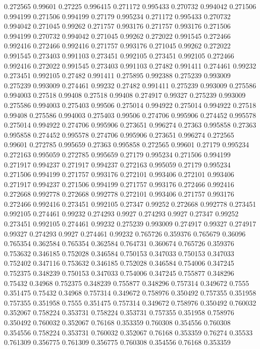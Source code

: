 0.272565 0.99601
0.27225 0.996415
0.271172 0.995433
0.270732 0.994042
0.271506 0.994199
0.271506 0.994199
0.27179 0.995234
0.271172 0.995433
0.270732 0.994042
0.271045 0.99262
0.271757 0.993176
0.271757 0.993176
0.271506 0.994199
0.270732 0.994042
0.271045 0.99262
0.272022 0.991545
0.272466 0.992416
0.272466 0.992416
0.271757 0.993176
0.271045 0.99262
0.272022 0.991545
0.273403 0.991103
0.273451 0.992105
0.273451 0.992105
0.272466 0.992416
0.272022 0.991545
0.273403 0.991103
0.27482 0.991411
0.274461 0.99232
0.273451 0.992105
0.27482 0.991411
0.275895 0.992388
0.275239 0.993009
0.275239 0.993009
0.274461 0.99232
0.27482 0.991411
0.275239 0.993009
0.275586 0.994003
0.27518 0.99408
0.27518 0.99408
0.274917 0.99327
0.275239 0.993009
0.275586 0.994003
0.275403 0.99506
0.275014 0.994922
0.275014 0.994922
0.27518 0.99408
0.275586 0.994003
0.275403 0.99506
0.274706 0.995906
0.274452 0.995578
0.275014 0.994922
0.274706 0.995906
0.273651 0.996274
0.27363 0.995858
0.27363 0.995858
0.274452 0.995578
0.274706 0.995906
0.273651 0.996274
0.272565 0.99601
0.272785 0.995659
0.27363 0.995858
0.272565 0.99601
0.27179 0.995234
0.272163 0.995059
0.272785 0.995659
0.27179 0.995234
0.271506 0.994199
0.271917 0.994237
0.271917 0.994237
0.272163 0.995059
0.27179 0.995234
0.271506 0.994199
0.271757 0.993176
0.272101 0.993406
0.272101 0.993406
0.271917 0.994237
0.271506 0.994199
0.271757 0.993176
0.272466 0.992416
0.272668 0.992778
0.272668 0.992778
0.272101 0.993406
0.271757 0.993176
0.272466 0.992416
0.273451 0.992105
0.27347 0.99252
0.272668 0.992778
0.273451 0.992105
0.274461 0.99232
0.274293 0.9927
0.274293 0.9927
0.27347 0.99252
0.273451 0.992105
0.274461 0.99232
0.275239 0.993009
0.274917 0.99327
0.274917 0.99327
0.274293 0.9927
0.274461 0.99232
0.765726 0.359376
0.765679 0.36096
0.765354 0.362584
0.765354 0.362584
0.764731 0.360674
0.765726 0.359376
0.753632 0.346185
0.752028 0.346584
0.750153 0.347033
0.750153 0.347033
0.752402 0.347116
0.753632 0.346185
0.752028 0.346584
0.754006 0.347245
0.752375 0.348239
0.750153 0.347033
0.754006 0.347245
0.755877 0.348296
0.75432 0.34968
0.752375 0.348239
0.755877 0.348296
0.757314 0.349672
0.7555 0.351475
0.75432 0.34968
0.757314 0.349672
0.758976 0.350492
0.757355 0.351958
0.757355 0.351958
0.7555 0.351475
0.757314 0.349672
0.758976 0.350492
0.760032 0.352067
0.758224 0.353731
0.758224 0.353731
0.757355 0.351958
0.758976 0.350492
0.760032 0.352067
0.76168 0.353359
0.760308 0.354556
0.760308 0.354556
0.758224 0.353731
0.760032 0.352067
0.76168 0.353359
0.76274 0.35533
0.761309 0.356775
0.761309 0.356775
0.760308 0.354556
0.76168 0.353359
